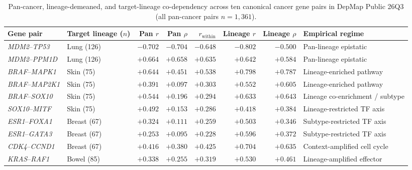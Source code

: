 \documentclass[11pt,a4paper]{article}
\begin{document}
\begin{table}[t]
\centering
\footnotesize
\caption{Pan-cancer, lineage-demeaned, and target-lineage co-dependency across ten canonical cancer gene pairs in DepMap Public 26Q3 (all pan-cancer pairs $n = 1{,}361$).}
\label{tab:codep}
\begin{tabular}{llrrrrrl}
\toprule
\textbf{Gene pair} & \textbf{Target lineage ($n$)} & \textbf{Pan $r$} & \textbf{Pan $\rho$} & \textbf{$r_{\mathrm{within}}$} & \textbf{Lineage $r$} & \textbf{Lineage $\rho$} & \textbf{Empirical regime} \\
\midrule
\textit{MDM2}--\textit{TP53} & Lung (126) & $-0.702$ & $-0.704$ & $-0.648$ & $-0.802$ & $-0.500$ & Pan-lineage epistatic \\
\textit{MDM2}--\textit{PPM1D} & Lung (126) & $+0.664$ & $+0.658$ & $+0.635$ & $+0.642$ & $+0.584$ & Pan-lineage epistatic \\
\textit{BRAF}--\textit{MAPK1} & Skin (75) & $+0.644$ & $+0.451$ & $+0.538$ & $+0.798$ & $+0.787$ & Lineage-enriched pathway \\
\textit{BRAF}--\textit{MAP2K1} & Skin (75) & $+0.391$ & $+0.097$ & $+0.303$ & $+0.552$ & $+0.605$ & Lineage-enriched pathway \\
\textit{BRAF}--\textit{SOX10} & Skin (75) & $+0.544$ & $+0.196$ & $+0.294$ & $+0.633$ & $+0.643$ & Lineage co-enrichment / subtype \\
\textit{SOX10}--\textit{MITF} & Skin (75) & $+0.492$ & $+0.153$ & $+0.286$ & $+0.418$ & $+0.384$ & Lineage-restricted TF axis \\
\textit{ESR1}--\textit{FOXA1} & Breast (67) & $+0.324$ & $+0.111$ & $+0.259$ & $+0.503$ & $+0.346$ & Subtype-restricted TF axis \\
\textit{ESR1}--\textit{GATA3} & Breast (67) & $+0.253$ & $+0.095$ & $+0.228$ & $+0.596$ & $+0.372$ & Subtype-restricted TF axis \\
\textit{CDK4}--\textit{CCND1} & Breast (67) & $+0.416$ & $+0.380$ & $+0.425$ & $+0.704$ & $+0.635$ & Context-amplified cell cycle \\
\textit{KRAS}--\textit{RAF1} & Bowel (85) & $+0.338$ & $+0.255$ & $+0.319$ & $+0.530$ & $+0.461$ & Lineage-amplified effector \\
\bottomrule
\end{tabular}
\end{table}
\end{document}
